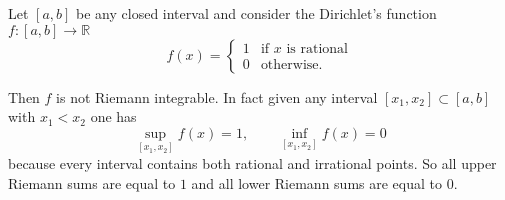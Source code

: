 \documentclass[12pt]{article}
\begin{document}
Let $[a,b]$ be any closed interval and
consider the Dirichlet's function $f\colon [a,b]\to\mathbb R$
\[
  f(x) = \begin{cases} 1 &\text{if $x$ is rational}\\
0 &\text{otherwise}.
\end{cases}
\]

Then $f$ is not Riemann integrable. In fact given any interval $[x_1,x_2]\subset [a,b]$ with $x_1<x_2$ one has
\[
 \sup_{[x_1,x_2]} f(x) = 1,\qquad
 \inf_{[x_1,x_2]} f(x) = 0
\]
because every interval contains both rational and irrational points.
So all upper Riemann sums are equal to $1$ and all lower Riemann sums are equal to $0$.
\end{document}
